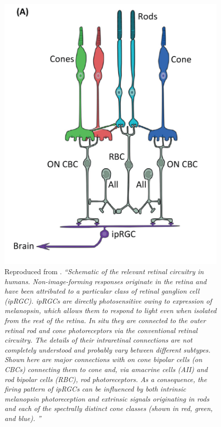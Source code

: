 \begin{figure}[htbp]
\includegraphics[max width=\textwidth, center]{figs/LitRev/lucas.png}
\caption{Reproduced from \citet{lucas_measuring_2014}. \textit{``Schematic of the relevant retinal circuitry in humans. Non-image-forming responses originate in the retina and have been attributed to a particular class of retinal ganglion cell (ipRGC). ipRGCs are directly photosensitive owing to expression of melanopsin, which allows them to respond to light even when isolated from the rest of the retina. In situ they are connected to the outer retinal rod and cone photoreceptors via the conventional retinal circuitry. The details of their intraretinal connections are not completely understood and probably vary between different subtypes. Shown here are major connections with on cone bipolar cells (on CBCs) connecting them to cone and, via amacrine cells (AII) and rod bipolar cells (RBC), rod photoreceptors. As a consequence, the firing pattern of ipRGCs can be influenced by both intrinsic melanopsin photoreception and extrinsic signals originating in rods and each of the spectrally distinct cone classes (shown in red, green, and blue). ''}}
\label{fig:lucas}
\end{figure}

